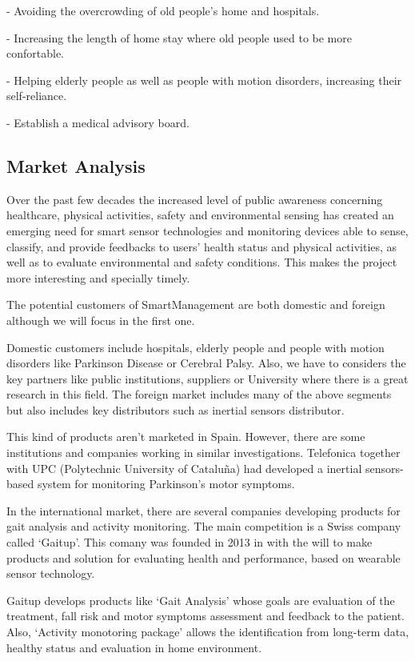 -	Avoiding the overcrowding of old people’s home and hospitals.

-	Increasing the length of home stay where old people used to be more confortable.

-	Helping elderly people as well as people with motion disorders, increasing their self-reliance.

-	Establish a medical advisory board.

\vfill

\subsection{Market Analysis}
 Over the past few decades the increased level of public awareness concerning healthcare, physical activities, safety and environmental sensing has created an emerging need for smart sensor technologies and monitoring devices able to sense, classify, and provide feedbacks to users’ health status and physical activities, as well as to evaluate environmental and safety conditions. This makes the project more interesting and specially timely.
 
 The potential customers of SmartManagement are both domestic and foreign although we will focus in the first one.
 
 Domestic customers include hospitals, elderly people and people with motion disorders like Parkinson Disease or Cerebral Palsy. Also, we have to considers the key partners like public institutions, suppliers or University where there is a great research in this field.
  The foreign market includes many of the above segments but also includes key distributors such as inertial sensors distributor.
 
 This kind of products aren’t marketed in Spain. However, there are some institutions and companies working in similar investigations. Telefonica  together with UPC (Polytechnic University of Cataluña) had developed a inertial sensors-based system for monitoring Parkinson's motor symptoms\cite{rempark}.
 
 In the international market, there are several companies developing products for gait analysis and activity monitoring. The main competition is a Swiss company called ‘Gaitup’\cite{gaitup}. This comany was founded in 2013 in with the will to make products and solution for evaluating health and performance, based on wearable sensor technology.
 
 Gaitup develops products like ‘Gait Analysis’ whose goals are evaluation of the treatment, fall risk and motor symptoms assessment and feedback to the patient. Also, ‘Activity monotoring package’ allows the identification from long-term data, healthy status and  evaluation in home environment.
 
